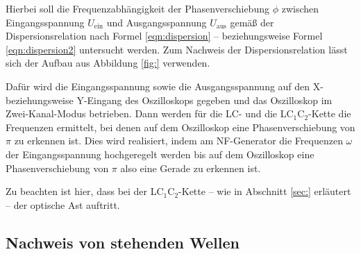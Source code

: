 Hierbei soll die Frequenzabhängigkeit der Phasenverschiebung $\phi$ 
zwischen Eingangsspannung $U_{\text{ein}}$ und Ausgangsspannung $U_{\text{aus}}$ gemäß der Dispersionsrelation nach Formel \eqref{eqn:dispersion}
-- beziehungsweise Formel \eqref{eqn:dispersion2} untersucht werden.
Zum Nachweis der Dispersionsrelation lässt sich der Aufbau aus Abbildung 
\ref{fig:} verwenden.

Dafür wird die Eingangsspannung sowie die Ausgangsspannung auf den X- beziehungsweise Y-Eingang 
des Oszilloskops gegeben und das Oszilloskop im Zwei-Kanal-Modus betrieben.
Dann werden für die LC- und die LC$_1$C$_2$-Kette die Frequenzen ermittelt, bei denen auf 
dem Oszilloskop eine Phasenverschiebung von $\pi$ zu erkennen ist.
Dies wird realisiert, indem am NF-Generator die Frequenzen $\omega$ der Eingangsspannung 
hochgeregelt werden bis auf dem Oszilloskop eine Phasenverschiebung von $\pi$ also eine 
Gerade zu erkennen ist.

Zu beachten ist hier, dass bei der LC$_1$C$_2$-Kette -- wie in Abschnitt \ref{sec:} erläutert 
-- der optische Ast auftritt.









\subsection{Nachweis von stehenden Wellen}
